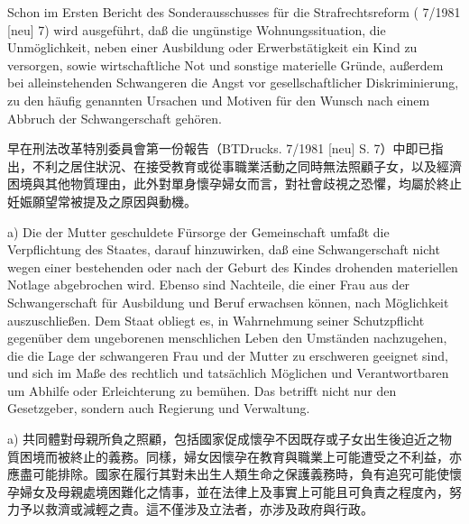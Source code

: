 \documentclass[12pt]{article}
\begin{document}
\begin{sourcepara}[title={原文D.59}]
Schon im Ersten Bericht des Sonderausschusses für die Strafrechtsreform (\abbrBTDrucks{} 7/1981 [neu] \abbrS{} 7) wird ausgeführt, daß die ungünstige Wohnungssituation, die Unmöglichkeit, neben einer Ausbildung oder Erwerbstätigkeit ein Kind zu versorgen, sowie wirtschaftliche Not und sonstige materielle Gründe, außerdem bei alleinstehenden Schwangeren die Angst vor gesellschaftlicher Diskriminierung, zu den häufig genannten Ursachen und Motiven für den Wunsch nach einem Abbruch der Schwangerschaft gehören.
\end{sourcepara}
\begin{transpara}
早在刑法改革特別委員會第一份報告（BTDrucks. 7/1981 [neu] S. 7）中即已指出，不利之居住狀況、在接受教育或從事職業活動之同時無法照顧子女，以及經濟困境與其他物質理由，此外對單身懷孕婦女而言，對社會歧視之恐懼，均屬於終止妊娠願望常被提及之原因與動機。
\end{transpara}

\begin{sourcepara}[title={原文D.60}]
a) Die der Mutter geschuldete Fürsorge der Gemeinschaft umfaßt die Verpflichtung des Staates, darauf hinzuwirken, daß eine Schwangerschaft nicht wegen einer bestehenden oder nach der Geburt des Kindes drohenden materiellen Notlage abgebrochen wird. Ebenso sind Nachteile, die einer Frau aus der Schwangerschaft für Ausbildung und Beruf erwachsen können, nach Möglichkeit auszuschließen. Dem Staat obliegt es, in Wahrnehmung seiner Schutzpflicht gegenüber dem ungeborenen menschlichen Leben den Umständen nachzugehen, die die Lage der schwangeren Frau und der Mutter zu erschweren geeignet sind, und sich im Maße des rechtlich und tatsächlich Möglichen und Verantwortbaren um Abhilfe oder Erleichterung zu bemühen. Das betrifft nicht nur den Gesetzgeber, sondern auch Regierung und Verwaltung.
\end{sourcepara}
\begin{transpara}
a) 共同體對母親所負之照顧，包括國家促成懷孕不因既存或子女出生後迫近之物質困境而被終止的義務。同樣，婦女因懷孕在教育與職業上可能遭受之不利益，亦應盡可能排除。國家在履行其對未出生人類生命之保護義務時，負有追究可能使懷孕婦女及母親處境困難化之情事，並在法律上及事實上可能且可負責之程度內，努力予以救濟或減輕之責。這不僅涉及立法者，亦涉及政府與行政。
\end{transpara}
\end{document}
